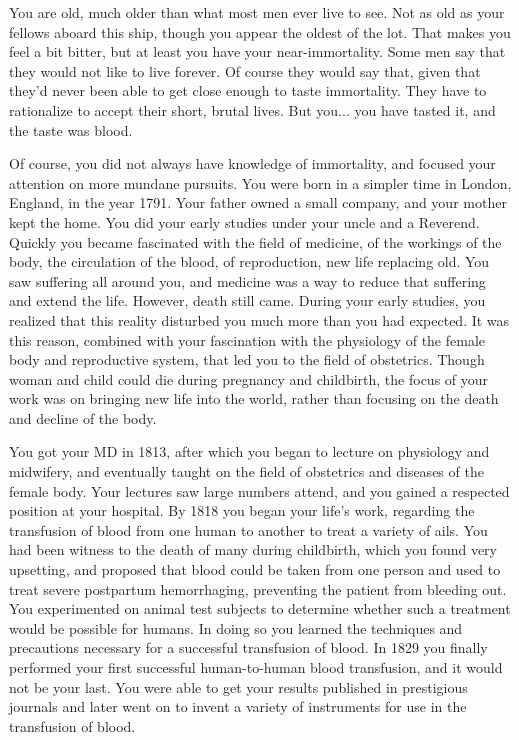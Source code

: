 \documentclass[char]{guildcamp4}
\begin{document}
\name{\cJames{}}


You are old, much older than what most men ever live to see. Not as old as your fellows aboard this ship, though you appear the oldest of the lot. That makes you feel a bit bitter, but at least you have your near-immortality. Some men say that they would not like to live forever. Of course they would say that, given that they'd never been able to get close enough to taste immortality. They have to rationalize to accept their short, brutal lives. But you... you have tasted it, and the taste was blood.

Of course, you did not always have knowledge of immortality, and focused your attention on more mundane pursuits. You were born in a simpler time in London, England, in the year 1791. Your father owned a small company, and your mother kept the home. You did your early studies under your uncle and a Reverend. Quickly you became fascinated with the field of medicine, of the workings of the body, the circulation of the blood, of reproduction, new life replacing old. You saw suffering all around you, and medicine was a way to reduce that suffering and extend the life. However, death still came. During your early studies, you realized that this reality disturbed you much more than you had expected. It was this reason, combined with your fascination with the physiology of the female body and reproductive system, that led you to the field of obstetrics. Though woman and child could die during pregnancy and childbirth, the focus of your work was on bringing new life into the world, rather than focusing on the death and decline of the body.

You got your MD in 1813, after which you began to lecture on physiology and midwifery, and eventually taught on the field of obstetrics and diseases of the female body. Your lectures saw large numbers attend, and you gained a respected position at your hospital. By 1818 you began your life's work, regarding the transfusion of blood from one human to another to treat a variety of ails. You had been witness to the death of many during childbirth, which you found very upsetting, and proposed that blood could be taken from one person and used to treat severe postpartum hemorrhaging, preventing the patient from bleeding out. You experimented on animal test subjects to determine whether such a treatment would be possible for humans. In doing so you learned the techniques and precautions necessary for a successful transfusion of blood. In 1829 you finally performed your first successful human-to-human blood transfusion, and it would not be your last. You were able to get your results published in prestigious journals and later went on to invent a variety of instruments for use in the transfusion of blood.
\end{document}
